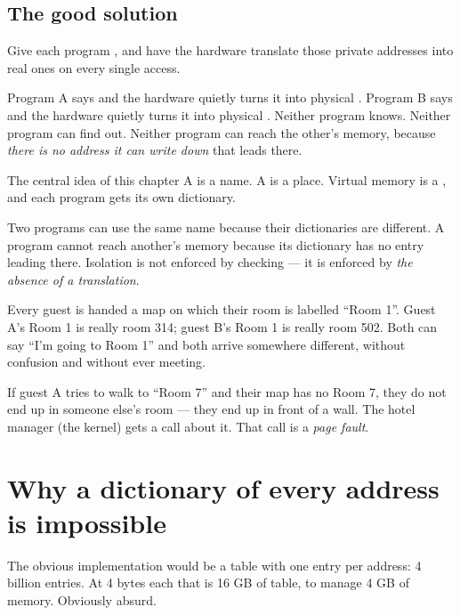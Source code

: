 \subsection{The good solution}

Give each program , and have the hardware translate
those private addresses into real ones on every single access.

Program A says  and the hardware quietly turns it into physical .
Program B says  and the hardware quietly turns it into physical .
Neither program knows. Neither program can find out. Neither program can reach the other's memory,
because \emph{there is no address it can write down} that leads there.

\begin{concept}{The central idea of this chapter}
A  is a name. A  is a place. Virtual memory is a
, and each program gets its own dictionary.

Two programs can use the same name because their dictionaries are different. A program cannot reach
another's memory because its dictionary has no entry leading there. Isolation is not enforced by
checking --- it is enforced by \emph{the absence of a translation}.
\end{concept}

\begin{analogy}
Every guest is handed a map on which their room is labelled ``Room 1''. Guest A's Room 1 is really
room 314; guest B's Room 1 is really room 502. Both can say ``I'm going to Room 1'' and both arrive
somewhere different, without confusion and without ever meeting.

If guest A tries to walk to ``Room 7'' and their map has no Room 7, they do not end up in someone
else's room --- they end up in front of a wall. The hotel manager (the kernel) gets a call about it.
That call is a \emph{page fault}.
\end{analogy}

\section{Why a dictionary of every address is impossible}

The obvious implementation would be a table with one entry per address: 4 billion entries. At 4
bytes each that is 16 GB of table, to manage 4 GB of memory. Obviously absurd.

